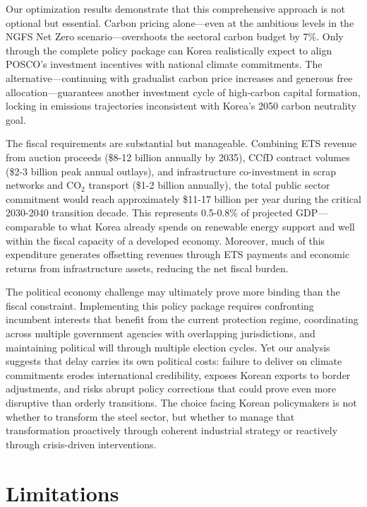 \documentclass[preprint,1p,authoryear]{elsarticle}
\begin{document}
Our optimization results demonstrate that this comprehensive approach is not optional but essential. Carbon pricing alone—even at the ambitious levels in the NGFS Net Zero scenario—overshoots the sectoral carbon budget by 7\%. Only through the complete policy package can Korea realistically expect to align POSCO's investment incentives with national climate commitments. The alternative—continuing with gradualist carbon price increases and generous free allocation—guarantees another investment cycle of high-carbon capital formation, locking in emissions trajectories inconsistent with Korea's 2050 carbon neutrality goal.

The fiscal requirements are substantial but manageable. Combining ETS revenue from auction proceeds (\$8-12 billion annually by 2035), CCfD contract volumes (\$2-3 billion peak annual outlays), and infrastructure co-investment in scrap networks and CO$_2$ transport (\$1-2 billion annually), the total public sector commitment would reach approximately \$11-17 billion per year during the critical 2030-2040 transition decade. This represents 0.5-0.8\% of projected GDP—comparable to what Korea already spends on renewable energy support and well within the fiscal capacity of a developed economy. Moreover, much of this expenditure generates offsetting revenues through ETS payments and economic returns from infrastructure assets, reducing the net fiscal burden.

The political economy challenge may ultimately prove more binding than the fiscal constraint. Implementing this policy package requires confronting incumbent interests that benefit from the current protection regime, coordinating across multiple government agencies with overlapping jurisdictions, and maintaining political will through multiple election cycles. Yet our analysis suggests that delay carries its own political costs: failure to deliver on climate commitments erodes international credibility, exposes Korean exports to border adjustments, and risks abrupt policy corrections that could prove even more disruptive than orderly transitions. The choice facing Korean policymakers is not whether to transform the steel sector, but whether to manage that transformation proactively through coherent industrial strategy or reactively through crisis-driven interventions.

\section{Limitations}\label{sec:limitations}
\end{document}

